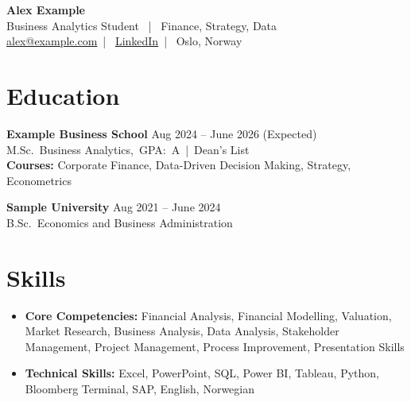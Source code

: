 \documentclass[10pt, a4paper]{article}   %
\newcommand{\eduentry}[3]{%
    \noindent\textbf{#1} \hfill {\small #2}\\[-1pt]
    {\small #3}%
}
\begin{document}

\begin{center}
    {\Large\bfseries Alex Example}\\[2pt]
    {\small Business Analytics Student ~|~ Finance, Strategy, Data}\\[1pt]
    {\small
        \href{mailto:alex@example.com}{alex@example.com}~|~%
        \href{https://www.linkedin.com/in/example}{LinkedIn}~|~%
        Oslo, Norway%
    }
\end{center}
\vspace{-4pt}

\section{Education}

\eduentry{Example Business School}{Aug 2024 -- June 2026 (Expected)}%
    {M.Sc.\ Business Analytics,~GPA:~A~|~Dean's List}\\[1pt]
{\small \textbf{Courses:} Corporate Finance, Data-Driven Decision Making, Strategy, Econometrics}

\vspace{3pt}
\eduentry{Sample University}{Aug 2021 -- June 2024}%
    {B.Sc.\ Economics and Business Administration}

\section{Skills}
\vspace{1pt}
\begin{itemize}[leftmargin=0in, label={}, itemsep=2pt]
    \item {\small\textbf{Core Competencies:}
        Financial Analysis, Financial Modelling, Valuation, Market Research,
        Business Analysis, Data Analysis, Stakeholder Management, Project Management,
        Process Improvement, Presentation Skills}
    \item {\small\textbf{Technical Skills:}
        Excel, PowerPoint, SQL, Power BI, Tableau, Python, Bloomberg Terminal, SAP, English, Norwegian}
\end{itemize}

\end{document}
